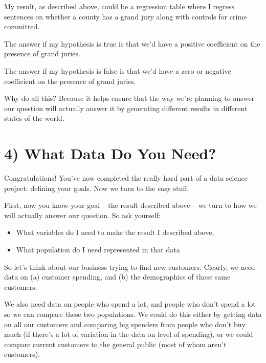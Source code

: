 \documentclass[letterpaper,10pt,english]{jupyterBook}
\begin{document}
\sphinxAtStartPar
My result, as described above, could be a regression table where I regress sentences on whether a county has a grand jury along with controls for crime committed.

\sphinxAtStartPar
The answer if my hypothesis is true is that we’d have a positive coefficient on the presence of grand juries.

\sphinxAtStartPar
The answer if my hypothesis is false is that we’d have a zero or negative coefficient on the presence of grand juries.

\sphinxAtStartPar
Why do all this? Because it helps ensure that the way we’re planning to answer our question will actually answer it by generating different results in different states of the world.


\section{4) What Data Do You Need?}
\label{\detokenize{40_in_practice/00_backwards_design:what-data-do-you-need}}
\sphinxAtStartPar
Congratulations! You’ve now completed the really hard part of a data science project: defining your goals. Now we turn to the easy stuff.

\sphinxAtStartPar
First, now you know your goal – the result described above – we turn to how we will actually answer our question. So ask yourself:
\begin{itemize}
\item {} 
\sphinxAtStartPar
What variables do I need to make the result I described above,

\item {} 
\sphinxAtStartPar
What population do I need represented in that data

\end{itemize}

\sphinxAtStartPar
So let’s think about our business trying to find new customers. Clearly, we need data on (a) customer spending, and (b) the demographics of those same customers.

\sphinxAtStartPar
We also need data on  people who spend a lot, and people who don’t spend a lot so we can compare these two populations. We could do this either by getting data on all our customers and comparing big spenders from people who don’t buy much (if there’s a lot of variation in the data on level of spending), or we could compare current customers to the general public (most of whom aren’t customers).
\end{document}
